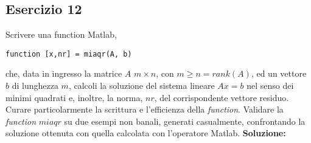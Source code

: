 \subsection{Esercizio 12}
Scrivere una function Matlab,
\begin{lstlisting}
function [x,nr] = miaqr(A, b)
\end{lstlisting}
che, data in ingresso la matrice $A$ $m \times n$, con $m \geq n = rank(A)$, ed un vettore $b$ di lunghezza
$m$, calcoli la soluzione del sistema lineare $Ax = b$ nel senso dei minimi quadrati e, inoltre, la
norma, $nr$, del corrispondente vettore residuo. Curare particolarmente la scrittura e l'efficienza della
\textit{function}. Validare la \textit{function} $miaqr$ su due esempi non banali, generati casualmente, confrontando
la soluzione ottenuta con quella calcolata con l'operatore Matlab.
\newline \textbf{Soluzione:} \newline
